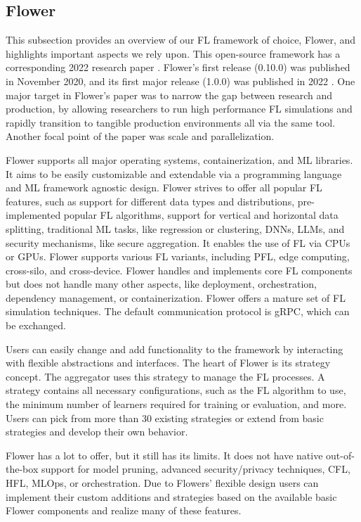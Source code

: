\subsection{Flower}

This subsection provides an overview of our FL framework of choice, Flower,
and highlights important aspects we rely upon.
This open-source framework has a corresponding 2022 research paper \cite{paper:flower}.
Flower's first release (0.10.0) was published in November 2020,
and its first major release (1.0.0) was published in 2022 \cite{fl_framework:flower}.
One major target in Flower's paper was to narrow the gap between research and production,
by allowing researchers to run high performance FL simulations and rapidly transition
to tangible production environments all via the same tool.
Another focal point of the paper was scale and parallelization.

Flower supports all major operating systems, containerization, and ML libraries.
It aims to be easily customizable and extendable via a programming language and ML framework agnostic design.
Flower strives to offer all popular FL features, such as support for different data types and distributions,
pre-implemented popular FL algorithms, support for vertical and horizontal data splitting,
traditional ML tasks, like regression or clustering, DNNs, LLMs, and security mechanisms, like secure aggregation.
It enables the use of FL via CPUs or GPUs.
Flower supports various FL variants, including
PFL, edge computing, cross-silo, and cross-device.
Flower handles and implements core FL components but does not handle many other aspects, like deployment,
orchestration, dependency management, or containerization.
Flower offers a mature set of FL simulation techniques.
The default communication protocol is gRPC, which can be exchanged.

Users can easily change and add functionality to the framework by interacting with flexible abstractions and interfaces.
The heart of Flower is its strategy concept.
The aggregator uses this strategy to manage the FL processes.
A strategy contains all necessary configurations,
such as the FL algorithm to use, the minimum number of learners required for training or evaluation, and more.
Users can pick from more than 30 existing strategies \cite{flower:strategies} or extend from basic strategies and develop their own behavior.

Flower has a lot to offer, but it still has its limits.
It does not have native out-of-the-box support for model pruning,
advanced security/privacy techniques, CFL, HFL, MLOps, or orchestration.
Due to Flowers' flexible design users can implement their custom additions and strategies
based on the available basic Flower components and realize many of these features.

